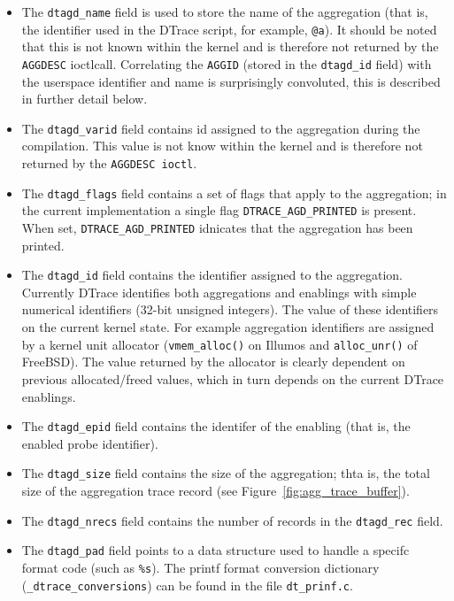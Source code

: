 \begin{itemize}

	\item The \texttt{dtagd\_name} field is used to store the name of the
aggregation (that is, the identifier used in the DTrace script, for example,
\texttt{@a}). It should be noted that this is not known within the kernel and
is therefore not returned by the \texttt{AGGDESC} ioctlcall.  Correlating the
\texttt{AGGID} (stored in the \texttt{dtagd\_id} field) with the userspace
identifier and name is surprisingly convoluted, this is described in further
detail below.

	\item The \texttt{dtagd\_varid} field contains id assigned to the
aggregation during the compilation. This value is not know within the kernel
and is therefore not returned by the \texttt{AGGDESC ioctl}.

	\item The \texttt{dtagd\_flags} field contains a set of flags that apply to
the aggregation; in the current implementation a single flag 
\texttt{DTRACE\_AGD\_PRINTED} is present. When set,
\texttt{DTRACE\_AGD\_PRINTED} idnicates that the aggregation has been printed.

	\item The \texttt{dtagd\_id} field contains the identifier assigned to the
aggregation. Currently DTrace identifies both aggregations and enablings with
simple numerical identifiers (32-bit unsigned integers). The value of these
identifiers on the current kernel state. For example aggregation identifiers
are assigned by a kernel unit allocator (\texttt{vmem\_alloc()} on Illumos and
\texttt{alloc\_unr()} of FreeBSD). The value returned by the allocator is
clearly dependent on previous allocated/freed values, which in turn depends on
the current DTrace enablings.

	\item The \texttt{dtagd\_epid} field contains the identifer of the enabling
(that is, the enabled probe identifier).

	\item The \texttt{dtagd\_size} field contains the size of the aggregation;
thta is, the total size of the aggregation trace record (see
Figure~\ref{fig:agg_trace_buffer}).

	\item The \texttt{dtagd\_nrecs} field contains the number of records in
the \texttt{dtagd\_rec} field.

	\item The \texttt{dtagd\_pad} field points to a data structure used to
handle a specifc format code (such as \texttt{\%s}). The printf format
conversion dictionary (\texttt{\_dtrace\_conversions}) can be found in the
file \texttt{dt\_prinf.c}.


\end{itemize}

